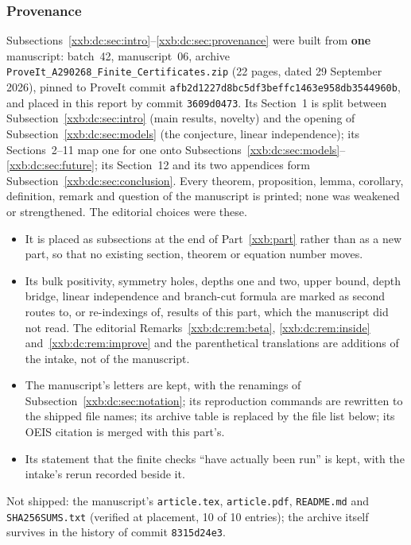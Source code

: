 \documentclass[11pt,a4paper]{article}
\numberwithin{equation}{section}
\theoremstyle{definition}
\theoremstyle{remark}
\theoremstyle{plain}
\begin{document}
\subsubsection{Provenance}
Subsections~\ref{xxb:dc:sec:intro}--\ref{xxb:dc:sec:provenance} were built from
\textbf{one} manuscript: batch~42, manuscript~06, archive
\texttt{ProveIt\_A290268\_Finite\_Certificates.zip} (22 pages, dated 29
September 2026), pinned to ProveIt commit
\texttt{afb2d1227d8bc5df\allowbreak 3beffc1463e958db\allowbreak 3544960b}, and placed in this report
by commit \texttt{3609d0473}.  Its Section~1 is split between
Subsection~\ref{xxb:dc:sec:intro} (main results, novelty) and the opening of
Subsection~\ref{xxb:dc:sec:models} (the conjecture, linear independence); its
Sections~2--11 map one for one onto
Subsections~\ref{xxb:dc:sec:models}--\ref{xxb:dc:sec:future}; its Section~12
and its two appendices form Subsection~\ref{xxb:dc:sec:conclusion}.  Every theorem, proposition, lemma, corollary,
definition, remark and question of the manuscript is printed; none was
weakened or strengthened.  The editorial choices were these.
\begin{itemize}[leftmargin=1.4em,itemsep=1pt]
\item It is placed as subsections at the end of Part~\ref{xxb:part} rather than
 as a new part, so that no existing section, theorem or equation number moves.
\item Its bulk positivity, symmetry holes, depths one and two, upper bound,
 depth bridge, linear independence and branch-cut formula are marked as second
 routes to, or re-indexings of, results of this part, which the manuscript did
 not read.  The editorial Remarks~\ref{xxb:dc:rem:beta}, \ref{xxb:dc:rem:inside}
 and~\ref{xxb:dc:rem:improve} and the parenthetical translations are additions
 of the intake, not of the manuscript.
\item The manuscript's letters are kept, with the renamings of
 Subsection~\ref{xxb:dc:sec:notation}; its reproduction commands are rewritten
 to the shipped file names; its archive table is replaced by the file list
 below; its OEIS citation is merged with this part's.
\item Its statement that the finite checks ``have actually been run'' is kept,
 with the intake's rerun recorded beside it.
\end{itemize}
Not shipped: the manuscript's \texttt{article.tex}, \texttt{article.pdf},
\texttt{README.md} and \texttt{SHA256SUMS.txt} (verified at placement, 10 of 10
entries); the archive itself survives in the history of commit
\texttt{8315d24e3}.
\end{document}
